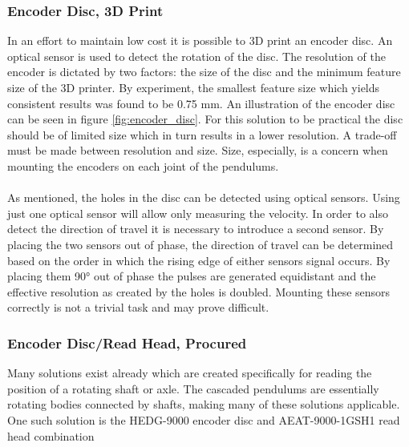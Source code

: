 \subsubsection{Encoder Disc, 3D Print} %
\label{ssub:encoder_wheel_3d_print}
In an effort to maintain low cost it is possible to 3D print an encoder disc.
An optical sensor is used to detect the rotation of the disc.
The resolution of the encoder is dictated by two factors: the size of the disc and the minimum feature size of the 3D printer.
By experiment, the smallest feature size which yields consistent results was found to be 0.75 mm.
An illustration of the encoder disc can be seen in figure \ref{fig:encoder_disc}.
For this solution to be practical the disc should be of limited size which in turn results in a lower resolution.
A trade-off must be made between resolution and size.
Size, especially, is a concern when mounting the encoders on each joint of the pendulums.
\\~\\
As mentioned, the holes in the disc can be detected using optical sensors.
Using just one optical sensor will allow only measuring the velocity.
In order to also detect the direction of travel it is necessary to introduce a second sensor.
By placing the two sensors out of phase, the direction of travel can be determined based on the order in which the rising edge of either sensors signal occurs.
By placing them 90\si{\degree} out of phase the pulses are generated equidistant and the effective resolution as created by the holes is doubled.
Mounting these sensors correctly is not a trivial task and may prove difficult.


\subsubsection{Encoder Disc/Read Head, Procured} %
\label{ssub:encoder_disc_read_head_procured}
Many solutions exist already which are created specifically for reading the position of a rotating shaft or axle.
The cascaded pendulums are essentially rotating bodies connected by shafts, making many of these solutions applicable.
\\
One such solution is the HEDG-9000\cite{hedg9000} encoder disc and AEAT-9000-1GSH1\cite{aeat9000} read head combination

